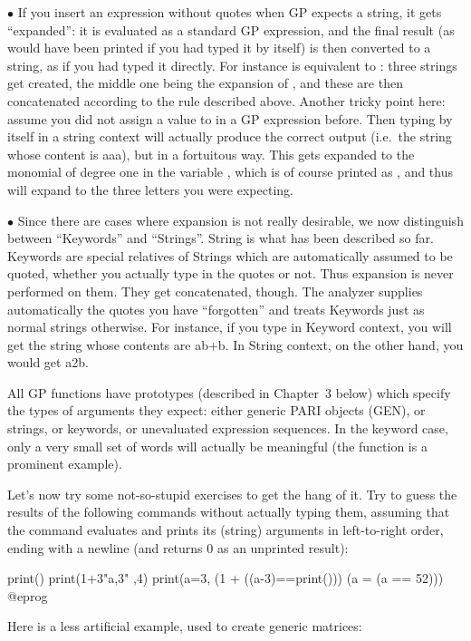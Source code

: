 $\bullet$ If you insert an expression without quotes when GP expects a
string, it gets ``expanded'': it is evaluated as a standard GP expression,
and the final result (as would have been printed if you had typed it by
itself) is then converted to a string, as if you had typed it directly. For
instance  is equivalent to : three strings get
created, the middle one being the expansion of , and these are then
concatenated according to the rule described above. Another tricky point
here: assume you did not assign a value to  in a GP expression
before. Then typing  by itself in a string context will actually
produce the correct output (i.e.~the string whose content is aaa), but in a
fortuitous way. This  gets expanded to the monomial of degree one in
the variable , which is of course printed as , and thus
will expand to the three letters you were expecting.

$\bullet$ Since there are cases where expansion is not really desirable, we
now distinguish between ``Keywords'' and ``Strings''. String is what has been
described so far. Keywords are special relatives of Strings which are
automatically assumed to be quoted, whether you actually type in the quotes
or not. Thus expansion is never performed on them. They get concatenated,
though. The analyzer supplies automatically the quotes you have ``forgotten''
and treats Keywords just as normal strings otherwise. For instance, if you
type  in Keyword context, you will get the string whose contents
are ab+b. In String context, on the other hand, you would get a2\kbd{*}b.

All GP functions have prototypes (described in Chapter~3 below) which
specify the types of arguments they expect: either generic PARI objects
(GEN), or strings, or keywords, or unevaluated expression sequences. In the
keyword case, only a very small set of words will actually be meaningful
(the  function is a prominent example).

Let's now try some not-so-stupid exercises to get the hang of it. Try to
guess the results of the following commands without actually typing them,
assuming that the  command evaluates and prints its (string)
arguments in left-to-right order, ending with a newline (and returns 0
as an unprinted result):

\bprog
  print()
  print(1+3"a,3" ,4)
  print(a=3, (1 + ((a-3)==print())) (a = (a == 5\/2)))
@eprog

\noindent Here is a less artificial example, used to create generic
matrices:

